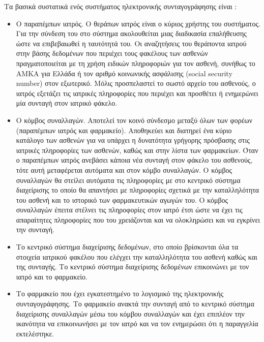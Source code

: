 		
		Τα βασικά συστατικά ενός συστήματος ηλεκτρονικής συνταγογράφησης είναι \cite{Grossman2012}:

		\begin{itemize}

		\item Ο παραπέμπων ιατρός. Ο θεράπων ιατρός είναι ο κύριος χρήστης  του συστήματος. Για την σύνδεση του στο σύστημα ακολουθείται μιας διαδικασία επαλήθευσης ώστε να επιβεβαιωθεί η ταυτότητά του. 
Οι αναζητήσεις του θεράποντα ιατρού στην βάσης δεδομένων που περιέχει τους φακέλους των ασθενών πραγματοποιείται με τη χρήση ειδικών πληροφοριών για τον ασθενή, συνήθως το ΑΜΚΑ για Ελλάδα ή τον αριθμό κοινωνικής ασφάλισης (social security number) στον εξωτερικό. Μόλις προσπελαστεί το σωστό αρχείο του ασθενούς, ο ιατρός εξετάζει τις ιατρικές πληροφορίες που περιέχει και προσθέτει ή ενημερώνει μία συνταγή στον ιατρικό φάκελο.
		
		\item Ο κόμβος συναλλαγών. Αποτελεί τον κοινό σύνδεσμο μεταξύ όλων των φορέων (παραπέμπων ιατρός και φαρμακείο). Αποθηκεύει και διατηρεί ένα κύριο κατάλογο των ασθενών για να υπάρχει η δυνατότητα γρήγορης πρόσβασης στις ιατρικές πληροφορίες των ασθενών, καθώς και στην λίστα των φαρμακείων. Όταν ο παραπέμπων ιατρός ανεβάσει κάποια νέα συνταγή στον φάκελο του ασθενούς, τότε αυτή μεταφέρεται αυτόματα και στον κόμβο συναλλαγών. Ο κόμβος συναλλαγών θα στείλει αυτόματα τις πληροφορίες  με στο κεντρικό σύστημα διαχείρισης το οποίο θα απαντήσει με πληροφορίες σχετικά με την καταλληλότητα του ασθενή και το ιστορικό των φαρμακευτικών αγωγών του.  Ο κόμβος συναλλαγών έπειτα στέλνει τις πληροφορίες στον ιατρό έτσι ώστε να έχει τις απαραίτητες πληροφορίες που του χρειάζονται και να ολοκληρώσει και να εγκρίνει την συνταγή. 
		
		\item Το κεντρικό σύστημα διαχείρισης δεδομένων, στο οποίο βρίσκονται όλα τα στοιχεία ιατρικού φακέλου που ελέγχει την καταλληλότητα του ασθενή καθώς και της συνταγής. Το κεντρικό σύστημα διαχείρισης δεδομένων επικοινώνει με τον ιατρό και το φαρμακείο.
		
		\item Το φαρμακείο που έχει εγκατεστημένο το λογισμικό της ηλεκτρονικής συνταγογράφησης. Το φαρμακείο ανακτά την συνταγή από  το κεντρικό σύστημα διαχείρισης συναλλαγών μέσω του κόμβου συναλλαγών και έχει επιπλέον την ικανότητα να επικοινωνήσει με τον ιατρό και να τον ενημερώσει ότι η παραγγελία εκτελέστηκε. 
		
		\end{itemize}
		
